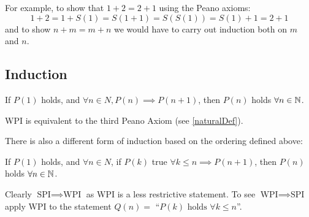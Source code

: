 \documentclass[../main.tex]{subfiles}
\begin{document}
\begin{example}
  For example, to show that $1 + 2 = 2 + 1$ using the Peano axioms:
  \[
    1 + 2 = 1 + S(1) = S(1 + 1) = S(S(1)) = S(1) + 1 = 2 + 1
  \]
  and to show $n + m = m + n$ we would have to carry out induction both on $m$ and $n$.
\end{example}
\subsection{Induction}
\begin{definition}
  If $P(1)$ holds, and $\forall n \in N, P(n) \implies P(n + 1)$, then $P(n)$ holds $\forall n \in \mathbb{N}$.
\end{definition}
\begin{remark}[Note]
  WPI is equivalent to the third Peano Axiom (see \cref{naturalDef}).
\end{remark}
There is also a different form of induction based on the ordering defined above:
\begin{definition}
  If $P(1)$ holds, and $\forall n \in N$, if $P(k)$ true $\forall k \leq n \implies P(n + 1)$, then $P(n)$ holds $\forall n \in \mathbb{N}$.
\end{definition}
Clearly $\text{SPI} \implies \text{WPI}$ as WPI is a less restrictive statement.
To see $\text{WPI} \implies \text{SPI}$ apply WPI to the statement $Q(n) =$ ``$P(k) \text{ holds } \forall k \leq n$''.
\end{document}
